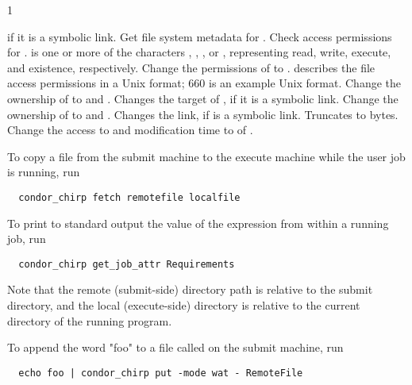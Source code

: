 \begin{ManPage}{\label{man-condor-chirp}}{1}
\begin{description}
{    if it is a symbolic link.}
    {Get file system metadata for .}
    {Check access permissions for . 
     is one or more of the characters , , 
    , or , representing read, write, execute, and 
    existence, respectively.}
    {Change the permissions of  to .
     describes the file access permissions in a Unix format;
    660 is an example Unix format. }
    {Change the ownership of  to  and .
    Changes the target of , if it is a symbolic link.}
    {Change the ownership of  to  and .
    Changes the link, if  is a symbolic link.}
    {Truncates  to  bytes.}
    {Change the access to  and modification time
    to  of .}
\end{description}

\Examples

To copy a file from the submit machine to the execute machine while the 
user job is running, run

\footnotesize
\begin{verbatim}
  condor_chirp fetch remotefile localfile
\end{verbatim}
\normalsize

To print to standard output the value of the 
expression from within a running job, run

\footnotesize
\begin{verbatim}
  condor_chirp get_job_attr Requirements
\end{verbatim}
\normalsize

Note that the remote (submit-side) directory path is relative to the
submit directory, and the local (execute-side) directory is relative to the
current directory of the running program.

To append the word "foo" to a file called  
on the submit machine, run

\footnotesize
\begin{verbatim}
  echo foo | condor_chirp put -mode wat - RemoteFile
\end{verbatim}
\normalsize


\end{ManPage}
